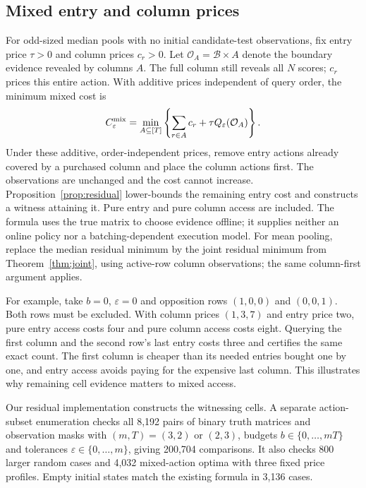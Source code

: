 \subsection{Mixed entry and column prices}
\label{app:mixed-prices}
For odd-sized median pools with no initial candidate-test observations, fix entry price $\tau>0$ and column prices $c_r>0$. Let $\mathcal O_A=\mathcal B\times A$ denote the boundary evidence revealed by columns $A$. The full column still reveals all $N$ scores; $c_r$ prices this entire action. With additive prices independent of query order, the minimum mixed cost is
\begin{equation}
 C_\varepsilon^{\rm mix}=
 \min_{A\subseteq[T]}\left\{\sum_{r\in A}c_r+
 \tau Q_\varepsilon(\mathcal O_A)\right\}.
 \label{eq:mixed-cost}
\end{equation}
Under these additive, order-independent prices, remove entry actions already covered by a purchased column and place the column actions first. The observations are unchanged and the cost cannot increase. Proposition~\ref{prop:residual} lower-bounds the remaining entry cost and constructs a witness attaining it. Pure entry and pure column access are included. The formula uses the true matrix to choose evidence offline; it supplies neither an online policy nor a batching-dependent execution model. For mean pooling, replace the median residual minimum by the joint residual minimum from Theorem~\ref{thm:joint}, using active-row column observations; the same column-first argument applies.

For example, take $b=0$, $\varepsilon=0$ and opposition rows $(1,0,0)$ and $(0,0,1)$. Both rows must be excluded. With column prices $(1,3,7)$ and entry price two, pure entry access costs four and pure column access costs eight. Querying the first column and the second row's last entry costs three and certifies the same exact count. The first column is cheaper than its needed entries bought one by one, and entry access avoids paying for the expensive last column. This illustrates why remaining cell evidence matters to mixed access.

Our residual implementation constructs the witnessing cells. A separate action-subset enumeration checks all 8,192 pairs of binary truth matrices and observation masks with $(m,T)=(3,2)$ or $(2,3)$, budgets $b\in\{0,\ldots,mT\}$ and tolerances $\varepsilon\in\{0,\ldots,m\}$, giving 200,704 comparisons. It also checks 800 larger random cases and 4,032 mixed-action optima with three fixed price profiles. Empty initial states match the existing formula in 3,136 cases.

